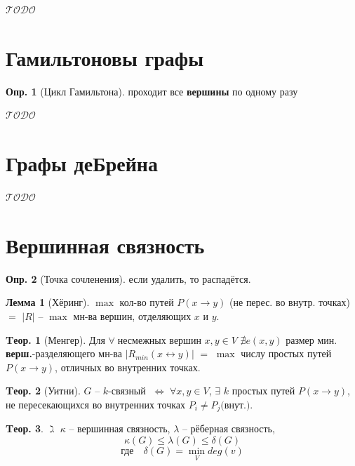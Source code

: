 \documentclass[a4paper,12pt]{article}
\numberwithin{figure}{section}
\theoremstyle{definition}
\newtheorem{definition}{Опр.}[section]
\theoremstyle{definition}
\newtheorem{theorem}{Tеор.}[section]
\newtheorem{lemma}{Лемма}[section]
\def\ilet{$\gimel\;$}
\def\iiff{$\;\Longleftrightarrow\;$}
\def\iiany{$\forall\;$}
\def\iiTODO{\guillemotleft$\mathcal{TODO}$\guillemotright\textellipsis}
\begin{document}
\iiTODO



\section{Гамильтоновы графы}

\begin{definition}[Цикл Гамильтона] проходит все \textbf{вершины} по одному разу \end{definition}

\iiTODO



\section{Графы деБрейна}

\iiTODO



\section{Вершинная связность}

\begin{definition}[Точка сочленения] если удалить, то распадётся.\end{definition}

\begin{lemma}[Хёринг]
	$\max$ кол-во путей $P(x \rightarrow y)$ (не перес. во внутр. точках) $=$ $|R|$ -- $\max$ мн-ва вершин, отделяющих $x$ и $y$.
\end{lemma}

\begin{theorem}[Менгер]
	Для \iiany несмежных вершин $x,y \in V$ $\nexists e(x,y)$ размер мин. \textbf{верш.}-разделяющего мн-ва $|R_{min}(x \leftrightarrow y)|$ $=$ $\max$ числу простых путей $P(x \rightarrow y)$, отличных во внутренних точках.
\end{theorem}

\begin{theorem}[Уитни]
	$G$ -- $k$-связный \iiff $\forall x,y \in V$, $\exists$ $k$ простых путей $P(x \rightarrow y)$, не пересекающихся во внутренних точках $P_i \neq P_j \text{(внут.)}$.
\end{theorem}

\begin{theorem}
	\ilet $\kappa$ -- вершинная связность, $\lambda$ -- рёберная связность,
	\[ \kappa(G) \leqslant \lambda(G) \leqslant \delta(G) \]
	\[ \text{где} \quad \delta(G) = \min_V deg(v) \]
\end{theorem}
\end{document}
